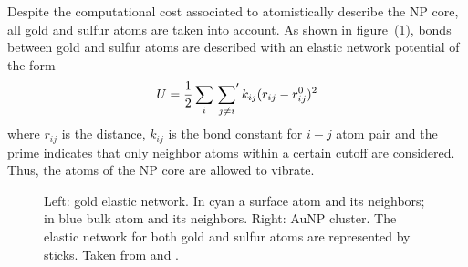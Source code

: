 Despite the computational cost associated to atomistically describe the \ac{NP} core, all gold and sulfur atoms 
are taken into account. As shown in figure~(\ref{fig:coreNetwork}), bonds between gold and sulfur atoms are 
described with an elastic network potential of the form
\begin{equation*}
	U = \frac{1}{2}\sum_i \sideset{}{'}\sum_{j\ne i}k_{ij}(r_{ij} - r_{ij}^0)^2
\end{equation*}
where $r_{ij}$ is the distance, $k_{ij}$ is the bond constant for $i-j$ atom pair and the prime indicates that 
only neighbor atoms within a certain cutoff are considered. Thus, the atoms of the \ac{NP} core are allowed to vibrate.
\begin{figure}[h!t]
	\centering%
	\qquad%
	\caption{Left: gold elastic network. In cyan a surface atom and its neighbors; in blue bulk atom and its neighbors. Right: \acs{AuNP} cluster. The elastic network for both gold and sulfur atoms are represented by sticks. Taken from \cite{simonelliThesis} and \cite{ourPaper}.}%
	\label{fig:coreNetwork}
\end{figure}

